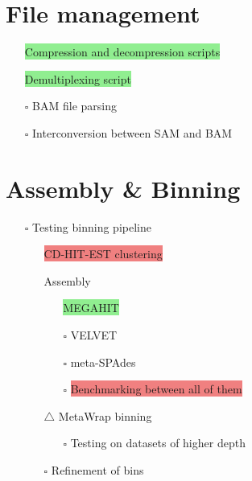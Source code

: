 \documentclass[11pt]{article}
\newcommand{\done}{\checkmark}  %
\newcommand{\pending}{$\square$}  %
\newcommand{\issue}{$\triangle$}  %
\newcommand{\highlightessential}[1]{\colorbox{lightgreen}{#1}}  %
\newcommand{\highlightoptional}[1]{\colorbox{lightorange}{#1}}  %
\newcommand{\highlightrobust}[1]{\colorbox{lightcoral}{#1}}  %
\begin{document}
	\section{File management}
	\begin{itemize}
		\item [\done] \highlightessential{Compression and decompression scripts}
		\item [\done] \highlightessential{Demultiplexing script}
		\item [\pending] \highlightoptional{BAM file parsing}
		\item [\pending] \highlightoptional{Interconversion between SAM and BAM}
	\end{itemize}
	
	\section{Assembly \& Binning}
	\begin{itemize}
		\item [\pending] Testing binning pipeline
		\begin{itemize}
			\item [\done] \highlightrobust{CD-HIT-EST clustering}
			\item [\done] Assembly
				\begin{itemize}
					\item [\done] \highlightessential{MEGAHIT}
					\item [\pending] \highlightoptional{VELVET}
					\item [\pending] \highlightoptional{meta-SPAdes}
					\item [\pending] \highlightrobust{Benchmarking between all of them}
				\end{itemize}
			\item [\issue] MetaWrap binning  
		\begin{itemize}
			\item [\pending] Testing on datasets of higher depth
		\end{itemize}
			
			\item [\pending] Refinement of bins
		\end{itemize}
	\end{itemize}

	
\end{document}
